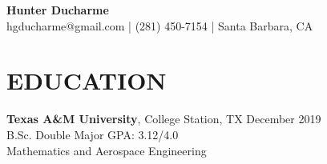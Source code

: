\documentclass[a4paper,9pt]{extarticle}
\begin{document}
\begin{center}
\textbf{\Large Hunter Ducharme}\\[2pt]
hgducharme@gmail.com | (281) 450-7154 | Santa Barbara, CA
\end{center}

\newcommand{\BartendingSummary}{I’m an experienced bartender with a passion for creating exceptional cocktails and providing excellent customer service. I have a proven track record of working efficiently in high-pressure environments while maintaining a friendly atmosphere and work environment. I am dedicated, reliable, and a team player looking to work with like-minded individuals who are committed to the success of the establishment.}

\newcommand{\FireSummary}{I’m an extremely dedicated and physically fit individual looking to extend my passion for the outdoors and serving the public through a wildland firefighting position. I have a proven track record working in a team environment in high stress situations, and am eager to contribute my efforts towards wildfire prevention, containment, and restoration efforts.}


\section*{EDUCATION}

\noindent
\textbf{Texas A\&M University}, College Station, TX \hfill December 2019\\
B.Sc. Double Major \hfill GPA: 3.12/4.0\\
Mathematics and Aerospace Engineering

\end{document}

